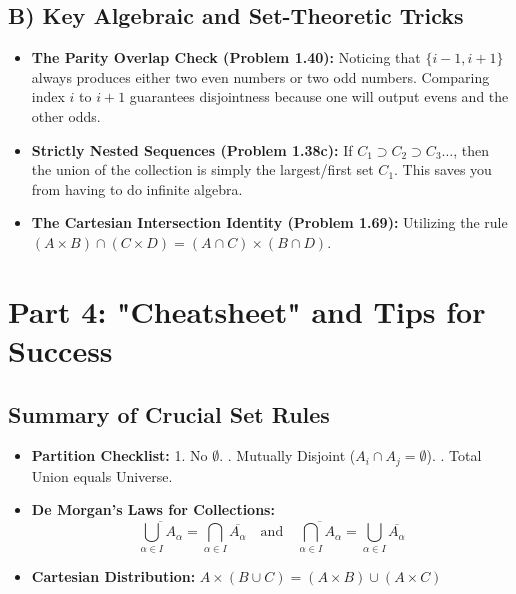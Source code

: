 \documentclass[12pt]{article}
\begin{document}
\subsection{B) Key Algebraic and Set-Theoretic Tricks}
\begin{itemize}
    \item \textbf{The Parity Overlap Check (Problem 1.40):} Noticing that $\{i-1, i+1\}$ always produces either two even numbers or two odd numbers. Comparing index $i$ to $i+1$ guarantees disjointness because one will output evens and the other odds.
    \item \textbf{Strictly Nested Sequences (Problem 1.38c):} If $C_1 \supset C_2 \supset C_3 \dots$, then the union of the collection is simply the largest/first set $C_1$. This saves you from having to do infinite algebra.
    \item \textbf{The Cartesian Intersection Identity (Problem 1.69):} Utilizing the rule $(A \times B) \cap (C \times D) = (A \cap C) \times (B \cap D)$.
\end{itemize}

\newpage
\section{Part 4: "Cheatsheet" and Tips for Success}

\subsection{Summary of Crucial Set Rules}
\begin{itemize}
    \item \textbf{Partition Checklist:} 1. No $\emptyset$. . Mutually Disjoint ($A_i \cap A_j = \emptyset$). . Total Union equals Universe.
    \item \textbf{De Morgan's Laws for Collections:} 
    \[ \overline{\bigcup_{\alpha \in I} A_\alpha} = \bigcap_{\alpha \in I} \overline{A_\alpha} \quad \text{and} \quad \overline{\bigcap_{\alpha \in I} A_\alpha} = \bigcup_{\alpha \in I} \overline{A_\alpha} \]
    \item \textbf{Cartesian Distribution:} $A \times (B \cup C) = (A \times B) \cup (A \times C)$
\end{itemize}
\end{document}
